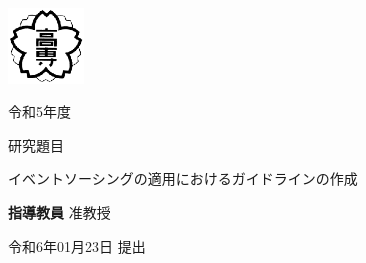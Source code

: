 \documentclass[../../main]{subfiles}
\begin{document}
    \begin{titlepage}
        \begin{center}
            \thispagestyle{empty}
            \includegraphics[width=2cm]{./picture/titlepage.png}
            \LARGE
            \keisen
            {
                 \fontsize{12mm}{12mm} \selectfont
            }
            \begin{flushright}
            {
                \huge
                令和5年度
            }
            \end{flushright}
            \vspace{-4mm}
            \keisen
            \vspace{1mm}
            \begin{flushleft}
                研究題目
            \end{flushleft}
            \vspace{1mm}
            {
                \huge
                イベントソーシングの適用におけるガイドラインの作成
            }
            \vspace{-2mm}
            \keisen
            \vspace{40mm}

            \begin{flushleft}
                \textbf{指導教員}
                \hspace{4zw}
                \hspace{2zw}准教授
            \end{flushleft}

            \vspace{-6mm}
            \keisen

            \begin{flushleft}
                \textbf{}
                \hspace{4zw}
            \end{flushleft}

            \vspace{-6mm}
            \keisen

            令和6年01月23日 提出

            \textbf{}

\end{center}
\end{titlepage}
\end{document}
